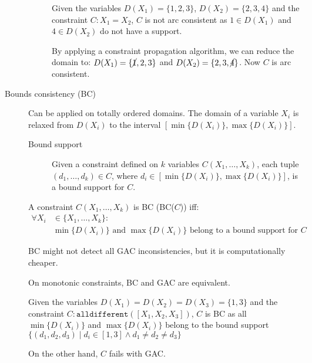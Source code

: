 \begin{description}
\begin{description}
                \begin{example}
                    Given the variables $D(X_1) = \{ 1, 2, 3 \}$, $D(X_2) = \{ 2, 3, 4 \}$ and the constraint $C: X_1 = X_2$,
                    $C$ is not arc consistent as $1 \in D(X_1)$ and $4 \in D(X_2)$ do not have a support.
        
                    By applying a constraint propagation algorithm, we can reduce the domain to: 
                    $D(X_1) = \{ \cancel{1}, 2, 3 \}$ and $D(X_2) = \{ 2, 3, \cancel{4} \}$.
                    Now $C$ is arc consistent.
                \end{example}
        \end{description}


    \item[Bounds consistency (BC)] 
        Can be applied on totally ordered domains.
        The domain of a variable $X_i$ is relaxed from $D(X_i)$ to the interval $[\min\{D(X_i)\}, \max\{D(X_i)\}]$.
        
        \begin{description}
            \item[Bound support]
                Given a constraint defined on $k$ variables $C(X_1, \dots, X_k)$,
                each tuple $(d_1, \dots, d_k) \in C$, where $d_i \in [\min\{D(X_i)\}, \max\{D(X_i)\}]$, is a bound support for $C$.
        \end{description}

        A constraint $C(X_1, \dots, X_k)$ is BC (BC($C$)) iff:
        \[ 
            \begin{split}
                \forall X_i &\in \{ X_1, \dots, X_k \}: \\
                    &\text{$\min\{D(X_i)\}$ and $\max\{D(X_i)\}$ belong to a bound support for $C$} 
            \end{split}
        \]

        \begin{remark}
            BC might not detect all GAC inconsistencies, but it is computationally cheaper.
        \end{remark}

        \begin{remark}
            On monotonic constraints, BC and GAC are equivalent.
        \end{remark}

        \begin{example}
            Given the variables $D(X_1) = D(X_2) = D(X_3) = \{ 1, 3 \}$ and the constraint $C: \texttt{alldifferent}([X_1, X_2, X_3])$,
            $C$ is BC as all $\min\{D(X_i)\}$ and $\max\{D(X_i)\}$ belong to the bound support $\{ (d_1, d_2, d_3) \mid d_i \in [1, 3] \land d_1 \neq d_2 \neq d_3 \}$

            On the other hand, $C$ fails with GAC.
        \end{example}
\end{description}


